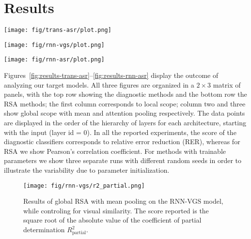 \section{Results}
\label{sec:results}

\begin{figure*}
  \centering
  \texttt{[image: fig/trans-asr/plot.png]}
  \caption{Results of diagnostic and RSA analytical methods applied to
    the Transformer-ASR model. The score is RER for the diagnostic methods and Pearson's $r$ for RSA.}
  \label{fig:results-trans-asr}
\end{figure*}

\begin{figure*}
  \centering
  \texttt{[image: fig/rnn-vgs/plot.png]}                                                                 
  \caption{Results of diagnostic and RSA analytical methods applied to
    the RNN-VGS model. The score is RER for the diagnostic methods and Pearson's $r$ for RSA. }
  \label{fig:results-rnn-vgs}
\end{figure*}

\begin{figure*}
  \centering
  \texttt{[image: fig/rnn-asr/plot.png]}                                                                 
  \caption{Results of diagnostic and RSA analytical methods applied to
    the RNN-ASR model. The score is RER for the diagnostic methods and Pearson's $r$ for RSA. }
  \label{fig:results-rnn-asr}
\end{figure*}

Figures~\ref{fig:results-trans-asr}--\ref{fig:results-rnn-asr} display
the outcome of analyzing our target models. All three figures are
organized in a $2\times 3$ matrix of panels, with the top row showing
the diagnostic methods and the bottom row the RSA methods; the first
column corresponds to local scope; column two and three show global
scope with mean and attention pooling respectively.  The data points
are displayed in the order of the hierarchy of layers for each
architecture, starting with the input (layer id = 0).  In all the
reported experiments, the score of the diagnostic classifiers
corresponds to relative error reduction (RER), whereas for RSA we show
Pearson's correlation coefficient. For methods with trainable
parameters we show three separate runs with different random seeds in
order to illustrate the variability due to parameter initialization.

\begin{figure}[htb]
  \centering
  \texttt{[image: fig/rnn-vgs/r2\_partial.png]}
  \caption{Results of global RSA with mean pooling on the RNN-VGS
    model, while controling for visual similarity. The score reported
    is the square root of the absolute value of the coefficient of
    partial determination $R^2_{\text{partial}}$.}
  \label{fig:rnn-vgs-r2_partial}
\end{figure}


